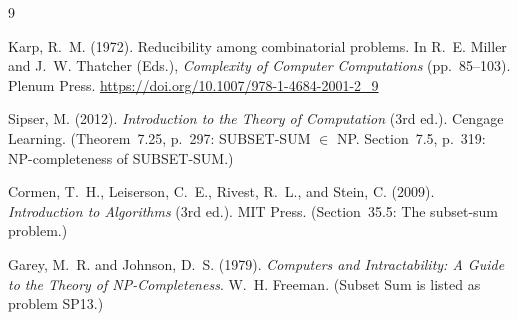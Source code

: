 \documentclass[12pt,a4paper]{article}
\theoremstyle{definition}
\begin{document}
\newpage
\begin{thebibliography}{9}

  Karp, R.~M. (1972).
  Reducibility among combinatorial problems.
  In R.~E. Miller and J.~W. Thatcher (Eds.),
  \textit{Complexity of Computer Computations} (pp.~85--103). Plenum Press.
  \url{https://doi.org/10.1007/978-1-4684-2001-2_9}

  Sipser, M. (2012).
  \textit{Introduction to the Theory of Computation} (3rd ed.).
  Cengage Learning.
  (Theorem~7.25, p.~297: SUBSET-SUM $\in$ NP.
   Section~7.5, p.~319: NP-completeness of SUBSET-SUM.)

  Cormen, T.~H., Leiserson, C.~E., Rivest, R.~L., and Stein, C. (2009).
  \textit{Introduction to Algorithms} (3rd ed.). MIT Press.
  (Section~35.5: The subset-sum problem.)

  Garey, M.~R. and Johnson, D.~S. (1979).
  \textit{Computers and Intractability: A Guide to the Theory of
  NP-Completeness}. W.~H. Freeman.
  (Subset Sum is listed as problem SP13.)

\end{thebibliography}
\end{document}
